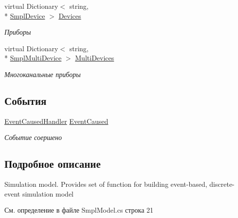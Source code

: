 \begin{DoxyCompactItemize}
virtual Dictionary$<$ string, \\*
\hyperlink{class_s_m_p_l_sharp_1_1_objects_1_1_smpl_device}{Smpl\-Device} $>$ \hyperlink{class_s_m_p_l_sharp_1_1_smpl_model_af79bc37f93c34d07abbdf36028581640}{Devices}
\begin{DoxyCompactList}\small\item\em Приборы \end{DoxyCompactList}\item 
virtual Dictionary$<$ string, \\*
\hyperlink{class_s_m_p_l_sharp_1_1_objects_1_1_smpl_multi_device}{Smpl\-Multi\-Device} $>$ \hyperlink{class_s_m_p_l_sharp_1_1_smpl_model_a6a37ccf8af439fc11b156eff04514e2e}{Multi\-Devices}
\begin{DoxyCompactList}\small\item\em Многоканальные приборы \end{DoxyCompactList}\end{DoxyCompactItemize}
\subsection*{События}
\begin{DoxyCompactItemize}
\item 
\hyperlink{namespace_s_m_p_l_sharp_a33fb2904b12541599362cddd40c71357}{Event\-Caused\-Handler} \hyperlink{class_s_m_p_l_sharp_1_1_smpl_model_abfa9344a73f4845e02be97fd5b963ed3}{Event\-Caused}
\begin{DoxyCompactList}\small\item\em Событие соершено \end{DoxyCompactList}\end{DoxyCompactItemize}


\subsection{Подробное описание}
Simulation model. Provides set of function for building event-\/based, discrete-\/event simulation model 



См. определение в файле Smpl\-Model.\-cs строка 21




